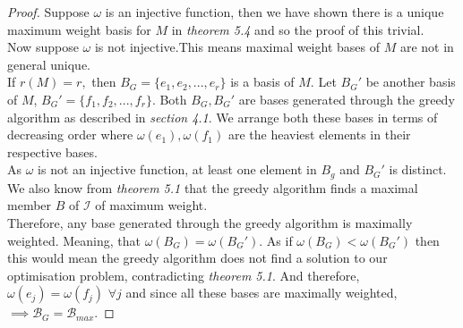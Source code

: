 \documentclass[../main.tex]{subfiles}
\begin{document}
\begin{proof}
Suppose $\omega$ is an injective function, then we have shown there is a unique maximum weight basis for $M$ in \textit{theorem 5.4} and so the proof of this trivial.\\
Now suppose $\omega$ is not injective.This means maximal weight bases of $M$ are not in general unique.\\
If $r(M) = r,$ then $B_G = \{e_1,e_2, ..., e_r\}$ is a basis of $M.$ Let $B_G'$ be another basis of $M$, $B_G' = \{f_1, f_2, ..., f_r\}.$ Both $B_G, B_G'$ are bases generated through the greedy algorithm as described in \textit{section 4.1}.
We arrange both these bases in terms of decreasing order where $\omega(e_1), \omega(f_1)$ are the heaviest elements in their respective bases.\\
As $\omega$ is not an injective function, at least one element in $B_g$ and $B_G'$ is distinct. We also know from \textit{theorem 5.1} that the greedy algorithm finds a maximal member $B$ of $\mathcal{I}$ of maximum weight.\\
\indent Therefore, any base generated through the greedy algorithm is maximally weighted. Meaning, that $\omega(B_G) = \omega(B_G').$ As if $\omega(B_G) < \omega(B_G')$ then this would mean the greedy algorithm does not find a solution to our optimisation problem, contradicting \textit{theorem 5.1}.
And therefore, $\omega(e_j) = \omega(f_j)$ $ \forall j$ and since all these bases are maximally weighted, $\implies \mathcal{B}_G = \mathcal{B}_{max}.$
\end{proof}
\end{document}
